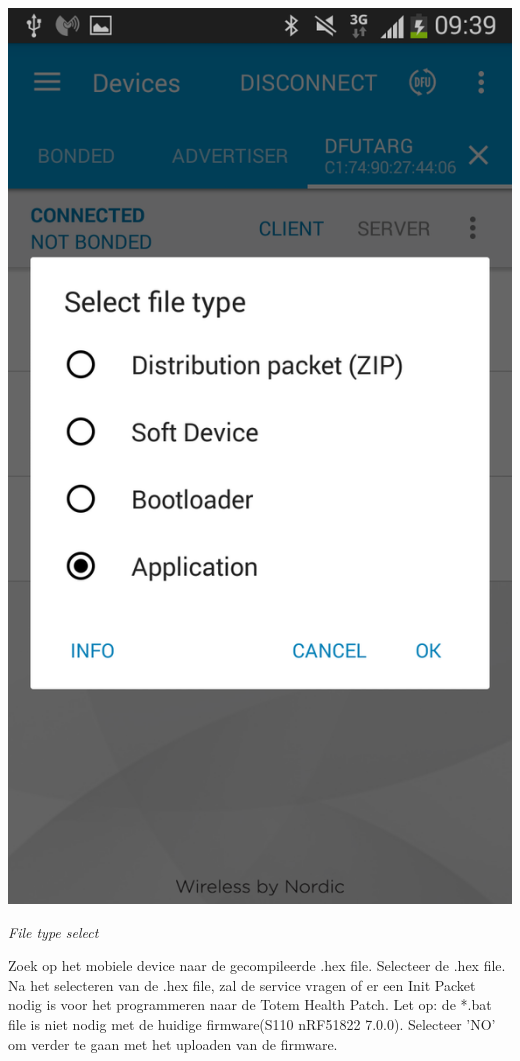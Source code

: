 \documentclass[conference]{IEEEtran}
\begin{document}
\begin{center}
    \includegraphics[scale=0.3]{FOTA6}
    \begin{minipage}{0.6\textwidth}
    \footnotesize
    \emph{File type select}
    \end{minipage}
\end{center}        

Zoek op het mobiele device naar de gecompileerde .hex file. Selecteer de .hex file. Na het selecteren van de .hex file, zal de service vragen of er een Init Packet nodig is voor het programmeren naar de Totem Health Patch. Let op: de *.bat file is niet nodig met de huidige firmware(S110 nRF51822 7.0.0). Selecteer 'NO' om verder te gaan met het uploaden van de firmware. 
\end{document}
